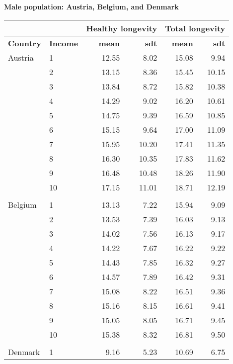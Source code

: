 \begin{table}
\centering \textbf{Male population: Austria, Belgium, and Denmark}\par\medskip\medskip
\begin{tabular}{llrrrr}
\toprule
& & \multicolumn{2}{l}{Healthy longevity} & \multicolumn{2}{l}{Total longevity} \\
\midrule
\textbf{Country }& \textbf{Income} &  \textbf{mean}       &  \textbf{sdt}     &     \textbf{mean}         & \textbf{sdt}    \\
\midrule
Austria & 1  &   12.55 &   8.02 &  15.08 &   9.94 \\
& 2  &   13.15 &   8.36 &  15.45 &  10.15 \\
& 3  &   13.84 &   8.72 &  15.82 &  10.38 \\
& 4  &   14.29 &   9.02 &  16.20 &  10.61 \\
 & 5  &   14.75 &   9.39 &  16.59 &  10.85 \\
& 6  &   15.15 &   9.64 &  17.00 &  11.09 \\
& 7  &   15.95 &  10.20 &  17.41 &  11.35 \\
& 8  &   16.30 &  10.35 &  17.83 &  11.62 \\
& 9  &   16.48 &  10.48 &  18.26 &  11.90 \\
 & 10 &   17.15 &  11.01 &  18.71 &  12.19 \\
               & &    &   &   &  \\
 Belgium & 1  &   13.13 &   7.22 &  15.94 &   9.09 \\
            & 2  &   13.53 &   7.39 &  16.03 &   9.13 \\
            & 3  &   14.02 &   7.56 &  16.13 &   9.17 \\
            & 4  &   14.22 &   7.67 &  16.22 &   9.22 \\
            & 5  &   14.43 &   7.85 &  16.32 &   9.27 \\
            & 6  &   14.57 &   7.89 &  16.42 &   9.31 \\
            & 7  &   15.08 &   8.22 &  16.51 &   9.36 \\
            & 8  &   15.16 &   8.15 &  16.61 &   9.41 \\
            & 9  &   15.05 &   8.05 &  16.71 &   9.45 \\
            & 10 &   15.38 &   8.32 &  16.81 &   9.50 \\
              & &    &   &   &  \\
Denmark & 1  &    9.16 &   5.23 &  10.69 &   6.75 \\

\end{tabular}
\end{table}
